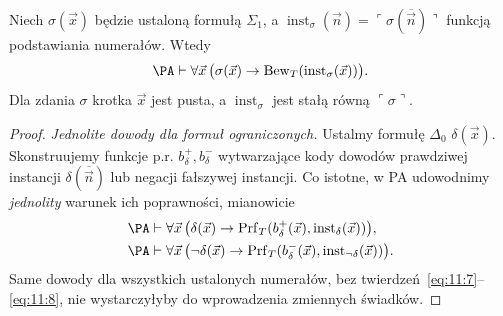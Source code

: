 \begin{lemat}\label{res:11:5}
Niech $\sigma(\vec x)$ będzie ustaloną formułą $\Sigma_1$, a $\operatorname{inst}_\sigma(\vec n)=\ulcorner\sigma(\overline{\vec n})\urcorner$ funkcją podstawiania numerałów. Wtedy
\begin{equation}\label{eq:11:6}
\PA\vdash\forall\vec x\,\bigl(\sigma(\vec x)
\to\operatorname{Bew}_T(\operatorname{inst}_\sigma(\vec x))\bigr).
\end{equation}
Dla zdania $\sigma$ krotka $\vec x$ jest pusta, a $\operatorname{inst}_\sigma$ jest stałą równą $\ulcorner\sigma\urcorner$.
\end{lemat}
\begin{proof}
\emph{Jednolite dowody dla formuł ograniczonych.} Ustalmy formułę $\Delta_0$ $\delta(\vec x)$. Skonstruujemy funkcje p.r. $b_\delta^+,b_\delta^-$ wytwarzające kody dowodów prawdziwej instancji $\delta(\overline{\vec n})$ lub negacji fałszywej instancji. Co istotne, w PA udowodnimy \emph{jednolity} warunek ich poprawności, mianowicie
\begin{align}
\PA&\vdash\forall\vec x\,\bigl(\delta(\vec x)\to
\operatorname{Prf}_T(b_\delta^+(\vec x),\operatorname{inst}_\delta(\vec x))\bigr),\label{eq:11:7}\\
\PA&\vdash\forall\vec x\,\bigl(\neg\delta(\vec x)\to
\operatorname{Prf}_T(b_\delta^-(\vec x),\operatorname{inst}_{\neg\delta}(\vec x))\bigr).\label{eq:11:8}
\end{align}
Same dowody dla wszystkich ustalonych numerałów, bez twierdzeń~\eqref{eq:11:7}--\eqref{eq:11:8}, nie wystarczyłyby do wprowadzenia zmiennych świadków.


\end{proof}
